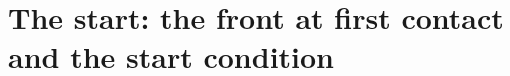 %

\newcommand{\STas}{\alpha_{\mathrm s}}
\newcommand{\STrs}{\rho_{\mathrm s}}
\newcommand{\STps}{\phi_{\mathrm s}}
\newcommand{\STA}{\mathsf A}
\newcommand{\STB}{\mathsf B}
\newcommand{\STm}{\mathsf m}
\newcommand{\STcA}{\mathcal A}
\newcommand{\STme}{m_\varepsilon}
\newcommand{\STG}{\Gamma_{\!\varepsilon}}

\section{The start: the front at first contact and the start condition}\label{sec:start}

